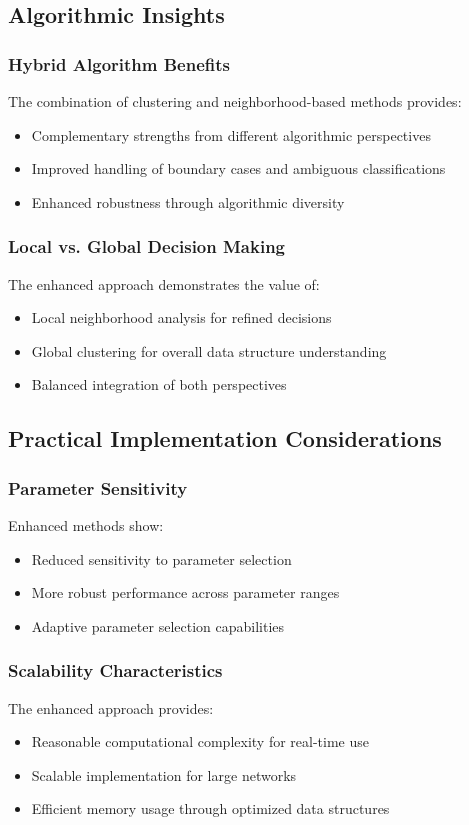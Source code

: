 \subsection{Algorithmic Insights}

\subsubsection{Hybrid Algorithm Benefits}
The combination of clustering and neighborhood-based methods provides:
\begin{itemize}
\item Complementary strengths from different algorithmic perspectives
\item Improved handling of boundary cases and ambiguous classifications
\item Enhanced robustness through algorithmic diversity
\end{itemize}

\subsubsection{Local vs. Global Decision Making}
The enhanced approach demonstrates the value of:
\begin{itemize}
\item Local neighborhood analysis for refined decisions
\item Global clustering for overall data structure understanding
\item Balanced integration of both perspectives
\end{itemize}

\subsection{Practical Implementation Considerations}

\subsubsection{Parameter Sensitivity}
Enhanced methods show:
\begin{itemize}
\item Reduced sensitivity to parameter selection
\item More robust performance across parameter ranges
\item Adaptive parameter selection capabilities
\end{itemize}

\subsubsection{Scalability Characteristics}
The enhanced approach provides:
\begin{itemize}
\item Reasonable computational complexity for real-time use
\item Scalable implementation for large networks
\item Efficient memory usage through optimized data structures
\end{itemize}

